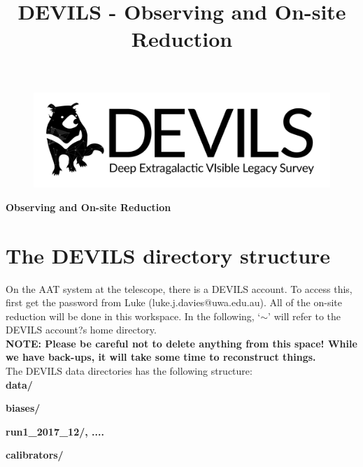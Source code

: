 \documentclass[12pt]{article}
\begin{document}
\title{DEVILS - Observing and On-site Reduction}
\begin{center}

\begin{figure}
\begin{center}
\includegraphics[scale=0.8]{devils-logo_big.png}
\end{center}
\end{figure}

\Huge {\textcolor{PineGreen}{\textbf{Observing and On-site Reduction}}}
\end{center}
\normalsize


\section{The DEVILS directory structure}


On the AAT system at the telescope, there is a DEVILS account. To access this, first get the password from Luke (luke.j.davies@uwa.edu.au). All of the on-site reduction will be done in this workspace.  In the following, `$\sim$' will refer to the DEVILS account?s home directory.\\

\textcolor{PineGreen}{\textbf{NOTE: Please be careful not to delete anything from this space! While we have back-ups, it will take some time to reconstruct things.}}\\

The DEVILS data directories has the following structure:\\

\hspace{5mm} \textbf{data/} 
\vspace{1mm}

\hspace{10mm} \textbf{biases/}
\vspace{1mm}

\hspace{15mm} \textbf{run1\_2017\_12/, ....} 
\vspace{1mm}

\hspace{10mm} \textbf{calibrators/} 
\vspace{1mm}
\end{document}
